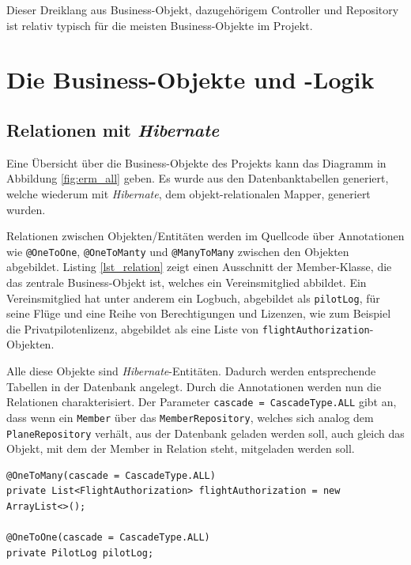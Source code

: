 \documentclass[a4paper, 11pt]{article}
\begin{document}
Dieser Dreiklang aus Business-Objekt, dazugehörigem Controller und Repository
ist relativ typisch für die meisten Business-Objekte im Projekt.

\section{Die Business-Objekte und -Logik}

\subsection{Relationen mit \emph{Hibernate}}

Eine Übersicht über die Business-Objekte des Projekts kann das Diagramm in
Abbildung \ref{fig:erm_all} geben. Es wurde aus den Datenbanktabellen
generiert, welche wiederum mit \emph{Hibernate}, dem objekt-relationalen
Mapper, generiert wurden.

Relationen zwischen Objekten/Entitäten werden im Quellcode über Annotationen
wie \lstinline{@OneToOne}, \lstinline{@OneToManty} und \lstinline{@ManyToMany}
zwischen den Objekten abgebildet. Listing \ref{lst_relation} zeigt einen
Ausschnitt der Member-Klasse, die das zentrale Business-Objekt ist, welches ein
Vereinsmitglied abbildet. Ein Vereinsmitglied hat unter anderem ein Logbuch,
abgebildet als \lstinline{pilotLog}, für seine Flüge und eine Reihe von
Berechtigungen und Lizenzen, wie zum Beispiel die Privatpilotenlizenz,
abgebildet als eine Liste von \lstinline{flightAuthorization}-Objekten.

Alle diese Objekte sind \emph{Hibernate}-Entitäten. Dadurch werden
entsprechende Tabellen in der Datenbank angelegt. Durch die Annotationen werden
nun die Relationen charakterisiert. Der Parameter \lstinline{cascade = CascadeType.ALL} gibt an, dass wenn ein \lstinline{Member} über das
\lstinline{MemberRepository}, welches sich analog dem
\lstinline{PlaneRepository} verhält, aus der Datenbank geladen werden soll,
auch gleich das Objekt, mit dem der Member in Relation steht, mitgeladen werden
soll.

\begin{lstlisting}[caption=Verknüpfung zu anderen Entitäten in der Member-Klasse,label=lst_relation]
@OneToMany(cascade = CascadeType.ALL)
private List<FlightAuthorization> flightAuthorization = new ArrayList<>();

@OneToOne(cascade = CascadeType.ALL)
private PilotLog pilotLog;
\end{lstlisting}
\end{document}
